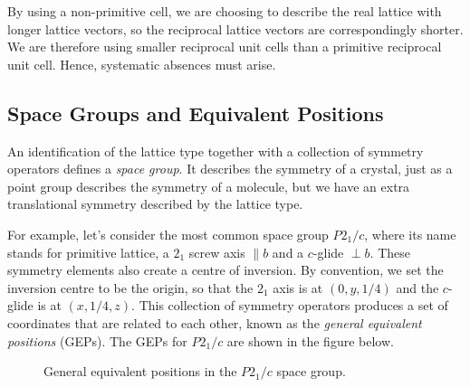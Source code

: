 \documentclass{article}
\theoremstyle{plain}\theoremheaderfont{\normalfont\itshape}\theorembodyfont{\rmfamily}\theoremseparator{.}\newtheorem*{rem}{Remark}\newtheorem*{ex}{Example}\newtheorem*{proof}{Proof}\newtheorem*{altp}{Alternative proof}
\theoremstyle{plain}\theoremheaderfont{\normalfont\bfseries}\theorembodyfont{\rmfamily}\theoremseparator{.}\newtheorem{thm}{Theorem}[section]\newtheorem{lem}[thm]{Lemma}\newtheorem{prop}[thm]{Proposition}\newtheorem*{cor}{Corollary}\newtheorem{defn}[thm]{Definition}\newtheorem{clm}[thm]{Claim}\newtheorem{clminproof}{Claim}\newtheorem*{law}{Law}\newtheorem{pos}[thm]{Postulate}
\theoremstyle{break}\theoremheaderfont{\normalfont\itshape}\theorembodyfont{\rmfamily}\theoremseparator{.\medskip}\newtheorem*{proofskip}{Proof}\newtheorem*{exs}{Examples}\newtheorem*{rems}{Remarks}
\theoremstyle{break}\theoremheaderfont{\normalfont\bfseries}\theorembodyfont{\rmfamily}\theoremseparator{.\medskip}\newtheorem{lemskip}[thm]{Lemma}\newtheorem{defnskip}[thm]{Definition}\newtheorem{propskip}[thm]{Proposition}\newtheorem{thmskip}[thm]{Theorem}
\numberwithin{equation}{section}
\begin{document}
    By using a non-primitive cell, we are choosing to describe the real lattice with longer lattice vectors, so the reciprocal lattice vectors are correspondingly shorter. We are therefore using smaller reciprocal unit cells than a primitive reciprocal unit cell. Hence, systematic absences must arise.

    \subsection{Space Groups and Equivalent Positions}
    An identification of the lattice type together with a collection of symmetry operators defines a \textit{space group}. It describes the symmetry of a crystal, just as a point group describes the symmetry of a molecule, but we have an extra translational symmetry described by the lattice type.

    For example, let's consider the most common space group \(P2_1/c\), where its name stands for primitive lattice, a \(2_1\) screw axis \(\parallel b\) and a \(c\)-glide \(\perp b\). These symmetry elements also create a centre of inversion. By convention, we set the inversion centre to be the origin, so that the \(2_1\) axis is at \((0,y,1/4)\) and the \(c\)-glide is at \((x,1/4,z)\). This collection of symmetry operators produces a set of coordinates that are related to each other, known as the \textit{general equivalent positions} (GEPs). The GEPs for \(P2_1/c\) are shown in the figure below.

    \begin{figure}[ht!]
        \centering
        \caption{General equivalent positions in the \(P2_1/c\) space group.}
    \end{figure}
\end{document}
